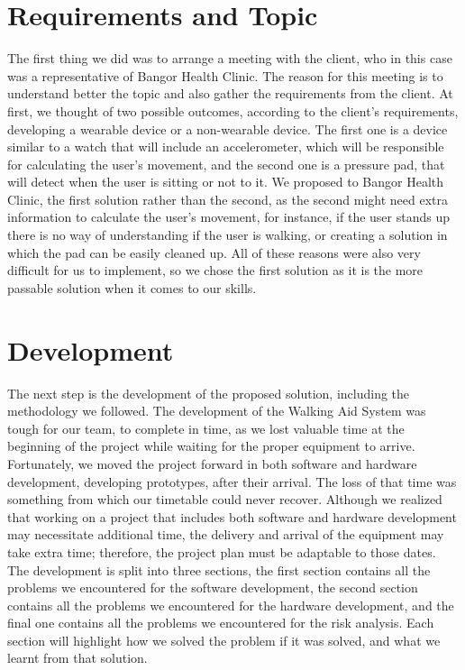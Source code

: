     \section{Requirements and Topic}
    \label{sec:reqs}

    The first thing we did was to arrange a meeting with the client, who in this case was a representative of Bangor Health Clinic. The reason for this meeting is to understand better the topic and also gather the requirements from the client. At first, we thought of two possible outcomes, according to the client's requirements, developing a wearable device or a non-wearable device. The first one is a device similar to a watch that will include an accelerometer, which will be responsible for calculating the user's movement, and the second one is a pressure pad, that will detect when the user is sitting or not to it. We proposed to Bangor Health Clinic, the first solution rather than the second, as the second might need extra information to calculate the user's movement, for instance, if the user stands up there is no way of understanding if the user is walking, or creating a solution in which the pad can be easily cleaned up. All of these reasons were also very difficult for us to implement, so we chose the first solution as it is the more passable solution when it comes to our skills.

    \section{Development}
    \label{sec:development}

    The next step is the development of the proposed solution, including the methodology we followed. The development of the Walking Aid System was tough for our team, to complete in time, as we lost valuable time at the beginning of the project while waiting for the proper equipment to arrive. Fortunately, we moved the project forward in both software and hardware development, developing prototypes, after their arrival. The loss of that time was something from which our timetable could never recover. Although we realized that working on a project that includes both software and hardware development may necessitate additional time, the delivery and arrival of the equipment may take extra time; therefore, the project plan must be adaptable to those dates. The development is split into three sections, the first section contains all the problems we encountered for the software development, the second section contains all the problems we encountered for the hardware development, and the final one contains all the problems we encountered for the risk analysis. Each section will highlight how we solved the problem if it was solved, and what we learnt from that solution.

